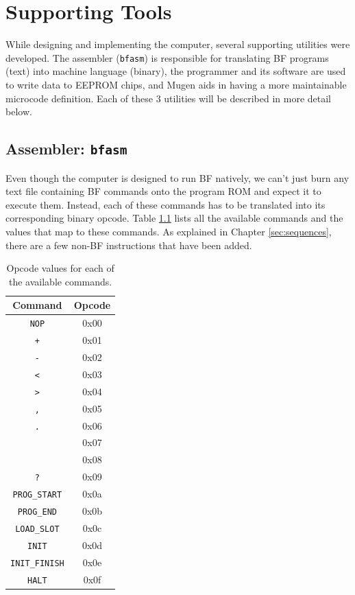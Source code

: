 \chapter{Supporting Tools} \label{sec:utilities}
While designing and implementing the computer, several supporting utilities were developed. The assembler (\texttt{bfasm}) is responsible for translating BF programs (text) into machine language (binary), the programmer and its software are used to write data to EEPROM chips, and Mugen aids in having a more maintainable microcode definition. Each of these 3 utilities will be described in more detail below.

\section{Assembler: \texttt{bfasm}} \label{sec:utilities:bfasm}
Even though the computer is designed to run BF natively, we can't just burn any text file containing BF commands onto the program ROM and expect it to execute them. Instead, each of these commands has to be translated into its corresponding binary opcode. Table \ref{tab:opcodes} lists all the available commands and the values that map to these commands. As explained in Chapter \ref{sec:sequences}, there are a few non-BF instructions that have been added.

\begin{table}[H]
  \centering
  \begin{tabular}{c|c}
    Command & Opcode \\ \hline
    \texttt{NOP} & 0x00 \\
    \texttt{+} & 0x01 \\
    \texttt{-} & 0x02 \\
    \texttt{<} & 0x03 \\
    \texttt{>} & 0x04 \\
    \texttt{,} & 0x05 \\
    \texttt{.} & 0x06 \\
    \texttt{\detokenize{[}} & 0x07 \\
    \texttt{\detokenize{]}} & 0x08 \\
    \texttt{?} & 0x09 \\
    \texttt{PROG\_START} & 0x0a \\
    \texttt{PROG\_END} & 0x0b \\
    \texttt{LOAD\_SLOT} & 0x0c \\
    \texttt{INIT} & 0x0d \\
    \texttt{INIT\_FINISH} & 0x0e \\
    \texttt{HALT}  & 0x0f 
  \end{tabular}
  \caption{Opcode values for each of the available commands.}
  \label{tab:opcodes}
\end{table}

